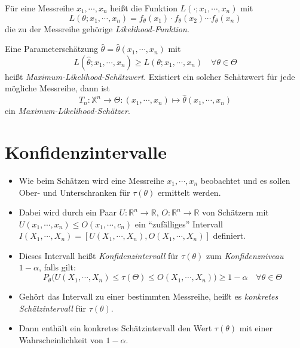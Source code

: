 \documentclass[a4paper, 11pt, accentcolor = tud3b]{tudreport}
\newcommand{\R}{\ensuremath{\mathbb{R}}}
\begin{document}
			Für eine Messreihe \( x_1, \cdots, x_n \) heißt die Funktion \( L(\cdot; x_1, \cdots, x_n) \) mit
			\begin{equation*}
				L(\theta; x_1, \cdots, x_n) = f_\theta(x_1) \cdot f_\theta(x_2) \cdots f_\theta(x_n)
			\end{equation*}
			die zu der Messreihe gehörige \textit{Likelihood-Funktion}.
			
			Eine Parameterschätzung \( \hat{\theta} = \hat{\theta}(x_1, \cdots, x_n) \) mit
			\begin{equation*}
				L(\hat{\theta}; x_1, \cdots, x_n) \geq L(\theta; x_1, \cdots, x_n) \quad \forall \theta \in \Theta
			\end{equation*}
			heißt \textit{Maximum-Likelihood-Schätzwert}. Existiert ein solcher Schätzwert für jede mögliche Messreihe, dann ist
			\begin{equation*}
				T_n : \mathbb{X}^n \rightarrow \Theta : (x_1, \cdots, x_n) \mapsto \hat{\theta} (x_1, \cdots, x_n)
			\end{equation*}
			ein \textit{Maximum-Likelihood-Schätzer}.

	    \section{Konfidenzintervalle}
	        \begin{itemize}
	        	\item Wie beim Schätzen wird eine Messreihe \(x_1, \cdots, x_n\) beobachtet und es sollen Ober- und Unterschranken für \( \tau(\theta) \) ermittelt werden.
	        	\item Dabei wird durch ein Paar \( U : \R^n \rightarrow \R \), \( O : \R^n \rightarrow \R \) von Schätzern mit \( U(x_1, \cdots, x_n) \leq O(x_1, \cdots, c_n) \) ein \enquote{zufälliges} Intervall \( I(X_1, \cdots, X_n) = [U(X_1, \cdots, X_n), O(X_1, \cdots, X_n)] \) definiert.
	        	\item Dieses Intervall heißt \textit{Konfidenzintervall} für \(\tau(\theta)\) zum \textit{Konfidenzniveau} \( 1 - \alpha \), falls gilt:
		        	\begin{equation*}
			        	P_\theta\big(U(X_1, \cdots, X_n) \leq \tau(\Theta) \leq O(X_1, \cdots, X_n)\big) \geq 1 - \alpha \quad \forall \theta \in \Theta
		        	\end{equation*}
		        \item Gehört das Intervall zu einer bestimmten Messreihe, heißt es \textit{konkretes Schätzintervall} für \(\tau(\theta)\).
		        \item Dann enthält ein konkretes Schätzintervall den Wert \(\tau(\theta)\) mit einer Wahrscheinlichkeit von \( 1 - \alpha \).
	        \end{itemize}
	
\end{document}
